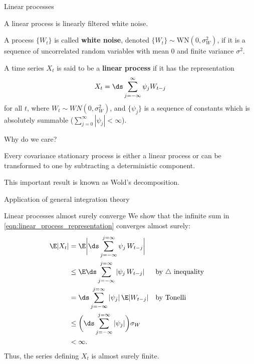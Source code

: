 \documentclass[10pt]{beamer}
\begin{document}
\begin{frame}{Linear processes}

A linear process is linearly filtered white noise. 

\vfill 
\begin{definition} 
A process $\{ W_t\}$ is called \textbf{white noise}, denoted $\{W_t\} \sim \text{WN}(0, \sigma^2_W)$, if it is a sequence of uncorrelated random variables with mean 0 and finite variance $\sigma^2$. 
\label{def:white_noise}
\end{definition}

\vfill 

\begin{definition}  \label{def:linear_process_representation}
A time series $X_t$ is said to be a \textbf{linear process} if it has the representation 
%
\begin{align}
X_t = \ds\sum_{j=-\infty}^\infty \psi_j W_{t-j}
\label{eqn:linear_process_representation}
\end{align}
%
for all $t$, where $W_t \sim WN(0, \sigma_W^2)$, and $\{ \psi_j\}$ is a sequence of constants which is absolutely summable ($\sum_{j=0}^\infty  |\psi_j| < \infty$).
\end{definition}
\end{frame}

\begin{frame}{Why do we care?}

\alert{Every} covariance stationary process is either a linear process or can be transformed to one by subtracting a deterministic component.  

This important result is known as Wold's decomposition.
	
\end{frame}

\begin{frame}{Application of general integration theory}  

\begin{block}{Linear processes almost surely converge}
We show that the infinite sum in  \eqref{eqn:linear_process_representation} converges almost surely:
%
\begin{align*}
 \E|X_t| &= \E \bigg|\ds\sum_{j=-\infty}^{j=\infty} \psi_j \, W_{t-j} \bigg| \\
 & \leq \E \ds\sum_{j=-\infty}^{j=\infty} |\psi_j \, W_{t-j}|  && \text{by $\triangle$ inequality} \\
 &= \ds\sum_{j=-\infty}^{j=\infty} |\psi_j| \, \E |W_{t-j}| && \text{by Tonelli} \\
 &\leq \bigg( \ds\sum_{j=-\infty}^{j=\infty} |\psi_j|  \bigg) \sigma_W \\
 &< \infty. 
 \end{align*}
%
Thus, the series defining $X_t$ is almost surely finite. %

\end{block}	
\end{frame}
\end{document}
